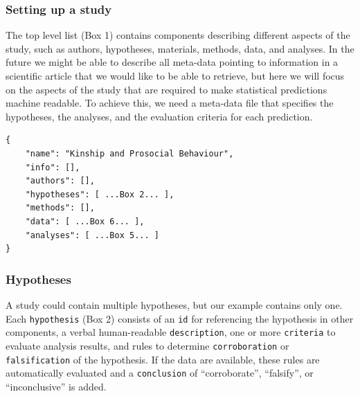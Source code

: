 \documentclass[
  english,
  doc,floatsintext]{apa6}
\begin{document}
\hypertarget{setting-up-a-study}{%
\subsubsection{Setting up a study}\label{setting-up-a-study}}

The top level list (Box 1) contains components describing different aspects of the study, such as authors, hypotheses, materials, methods, data, and analyses. In the future we might be able to describe all meta-data pointing to information in a scientific article that we would like to be able to retrieve, but here we will focus on the aspects of the study that are required to make statistical predictions machine readable. To achieve this, we need a meta-data file that specifies the hypotheses, the analyses, and the evaluation criteria for each prediction.

\begin{tcolorbox}[colback=black!5!white,colframe=white!5!black,title=Box 1. The top-level structure of the machine-readable study description.]
\begin{verbatim}
{
    "name": "Kinship and Prosocial Behaviour",
    "info": [],
    "authors": [],
    "hypotheses": [ ...Box 2... ],
    "methods": [],
    "data": [ ...Box 6... ],
    "analyses": [ ...Box 5... ]
}
\end{verbatim}
\end{tcolorbox}

\hypertarget{hypotheses}{%
\subsubsection{Hypotheses}\label{hypotheses}}

A study could contain multiple hypotheses, but our example contains only one. Each \texttt{hypothesis} (Box 2) consists of an \texttt{id} for referencing the hypothesis in other components, a verbal human-readable \texttt{description}, one or more \texttt{criteria} to evaluate analysis results, and rules to determine \texttt{corroboration} or \texttt{falsification} of the hypothesis. If the data are available, these rules are automatically evaluated and a \texttt{conclusion} of \enquote{corroborate}, \enquote{falsify}, or \enquote{inconclusive} is added.
\end{document}
